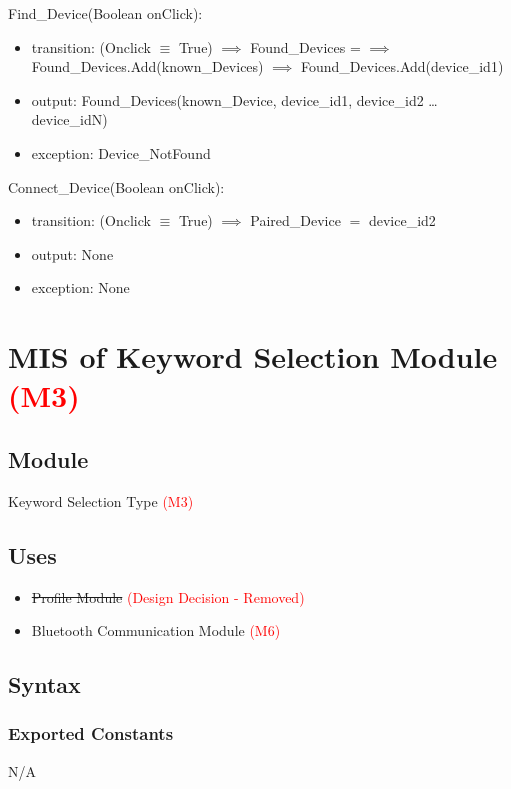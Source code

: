 \documentclass[12pt, titlepage]{article}
\begin{document}
\noindent Find\_Device(Boolean onClick):
\begin{itemize}
\item transition: (Onclick $\equiv$ True) $\implies$ Found\_Devices = {} $\implies$ Found\_Devices.Add(known\_Devices) $\implies$ Found\_Devices.Add(device\_id1) 
\item output: Found\_Devices(known\_Device, device\_id1, device\_id2 … device\_idN)
\item exception: Device\_NotFound 
\end{itemize}

\noindent Connect\_Device(Boolean onClick):
\begin{itemize}
\item transition: (Onclick $\equiv$ True) $\implies$ Paired\_Device $=$ device\_id2 
\item output: None
\item exception: None
\end{itemize}

\newpage


\section{MIS of Keyword Selection Module \textcolor{red}{(M3)}} \label{Keyword Selection Module}
\subsection{Module}
Keyword Selection Type \textcolor{red}{(M3)}

\subsection{Uses}
\begin{itemize}
  \item \sout{Profile Module} \textcolor{red}{(Design Decision - Removed)}
  \item Bluetooth Communication Module \textcolor{red}{(M6)}
  \end{itemize}

\subsection{Syntax}

\subsubsection{Exported Constants}
N/A
\end{document}
